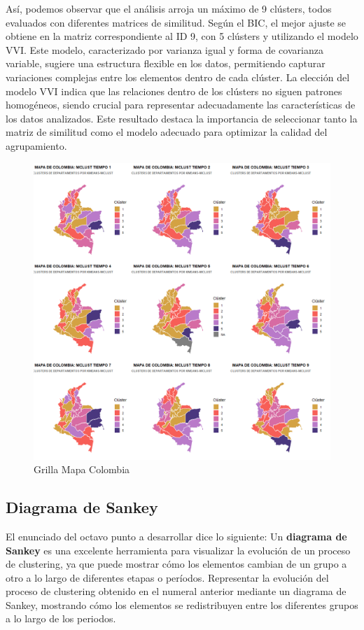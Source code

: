 \documentclass[12pt]{article}
\begin{document}
Así, podemos observar que el análisis arroja un máximo de 9 clústers, todos evaluados con diferentes matrices de similitud. Según el BIC, el mejor ajuste se obtiene en la matriz correspondiente al ID 9, con 5 clústers y utilizando el modelo VVI. Este modelo, caracterizado por varianza igual y forma de covarianza variable, sugiere una estructura flexible en los datos, permitiendo capturar variaciones complejas entre los elementos dentro de cada clúster. La elección del modelo VVI indica que las relaciones dentro de los clústers no siguen patrones homogéneos, siendo crucial para representar adecuadamente las características de los datos analizados. Este resultado destaca la importancia de seleccionar tanto la matriz de similitud como el modelo adecuado para optimizar la calidad del agrupamiento.

\begin{figure}[H]
    \centering
    \includegraphics[width=1\linewidth]{Imagenes/GrillaMapaColombia.png}
    \caption{Grilla Mapa Colombia}
    \label{fig_enter_label}
\end{figure}


\subsection{Diagrama de Sankey}

El enunciado del octavo punto a desarrollar dice lo siguiente: Un \textbf{diagrama de Sankey} es una excelente herramienta para visualizar la evolución de un proceso de clustering, ya que puede mostrar cómo los elementos cambian de un grupo a otro a lo largo de diferentes etapas o períodos. Representar la evolución del proceso de clustering obtenido en el numeral anterior mediante un diagrama de Sankey, mostrando cómo los elementos se redistribuyen entre los diferentes grupos a lo largo de los periodos.
\end{document}
